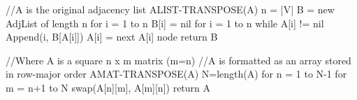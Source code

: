  //A is the original adjacency list
ALIST-TRANSPOSE(A)
	n = |V|
	B = new AdjList of length n
	for i = 1 to n
		B[i] = nil
	for i = 1 to n
		while A[i] != nil
			Append(i, B[A[i]])
			A[i] = next A[i] node
	return B

//Where A is a square n x m matrix (m=n)
//A is formatted as an array stored in row-major order
AMAT-TRANSPOSE(A) 
	N=length(A)
	for n = 1 to N-1
		for m = n+1 to N
			swap(A[n][m], A[m][n])
	return A